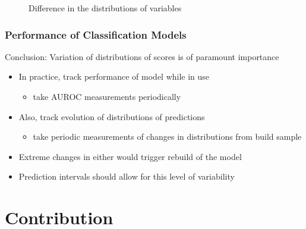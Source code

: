 \documentclass{beamer}
\begin{document}
\begin{frame}
\begin{figure}
\begin{minipage}[b]{0.45\linewidth}
            \caption{Difference in the distributions of variables}
        \end{minipage}
\end{figure}

\end{frame}



\begin{frame}
\frametitle{Performance of Classification Models}

Conclusion: Variation of distributions of scores is of paramount importance
\begin{itemize}
    \item In practice, track performance of model while in use
    \begin{itemize}
        \item take AUROC measurements periodically
    \end{itemize}
    \item Also, track evolution of distributions of predictions
    \begin{itemize}
        \item take periodic measurements of changes in distributions from build sample
    \end{itemize}
    \item Extreme changes in either would trigger rebuild of the model
    \item Prediction intervals should allow for this level of variability
\end{itemize}

\end{frame}




\section{Contribution}


\end{document}
